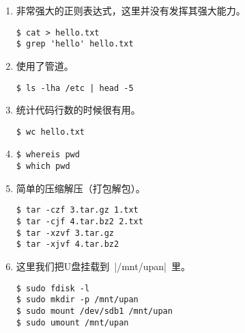 \documentclass[cs4size,a4paper,nofonts]{ctexart}
\begin{document}
\begin{enumerate}

\item 非常强大的正则表达式，这里并没有发挥其强大能力。
\begin{Verbatim}
$ cat > hello.txt
$ grep 'hello' hello.txt
\end{Verbatim}

\begin{figure}[htp]
\end{figure}

\item 使用了管道。
\begin{Verbatim}
$ ls -lha /etc | head -5
\end{Verbatim}

\begin{figure}[htp]
\end{figure}

\item 统计代码行数的时候很有用。
\begin{Verbatim}
$ wc hello.txt
\end{Verbatim}

\begin{figure}[htp]
\end{figure}

\item \begin{Verbatim}
$ whereis pwd
$ which pwd
\end{Verbatim}

\begin{figure}[htp]
\end{figure}

\item 简单的压缩解压（打包解包）。
\begin{Verbatim}
$ tar -czf 3.tar.gz 1.txt
$ tar -cjf 4.tar.bz2 2.txt
$ tar -xzvf 3.tar.gz
$ tar -xjvf 4.tar.bz2
\end{Verbatim}

\begin{figure}[htp]
\end{figure}

\item 这里我们把U盘挂载到~|/mnt/upan|~里。
\begin{Verbatim}
$ sudo fdisk -l
$ sudo mkdir -p /mnt/upan
$ sudo mount /dev/sdb1 /mnt/upan
$ sudo umount /mnt/upan
\end{Verbatim}


\end{enumerate}
\end{document}
